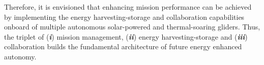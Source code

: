 \documentclass{ifacconf}
\begin{document}

Therefore, it is envisioned that enhancing mission performance can be
achieved by implementing the energy harvesting-storage and collaboration
capabilities onboard of multiple autonomous solar-powered and thermal-soaring
gliders. Thus, the triplet of (\emph{\textbf{i}}) mission management,
(\emph{\textbf{ii}}) energy harvesting-storage and (\emph{\textbf{iii}})
collaboration builds the fundamental architecture of future energy enhanced
autonomy.
%
\end{document}

